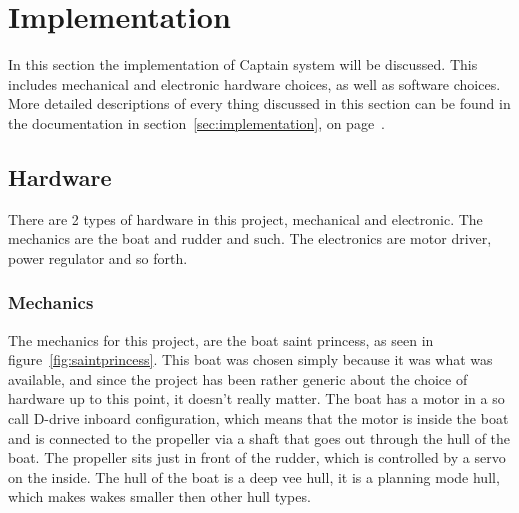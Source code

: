 \newpage
\chapter{Implementation}
In this section the implementation of Captain system will be discussed. This includes mechanical and electronic hardware choices, as well as software choices.
More detailed descriptions of every thing discussed in this section can be found in the documentation in section~\ref{sec:implementation}, on page~\pageref{sec:implementation}.

\section{Hardware}
There are 2 types of hardware in this project, mechanical and electronic. The mechanics are the boat and rudder and such. The electronics are motor driver, power regulator and so forth.

\subsection{Mechanics}
The mechanics for this project, are the boat saint princess, as seen in figure~\ref{fig:saintprincess}. This boat was chosen simply because it was what was available, and since the project has been rather generic about the choice of hardware up to this point, it doesn't really matter. The boat has a motor in a so call D-drive inboard configuration\cite{motor_config}, which means that the motor is inside the boat and is connected to the propeller via a shaft that goes out through the hull of the boat. The propeller sits just in front of the rudder, which is controlled by a servo on the inside. The hull of the boat is a deep vee hull\cite{hull-types}, it is a planning mode hull, which makes wakes smaller then other hull types.

